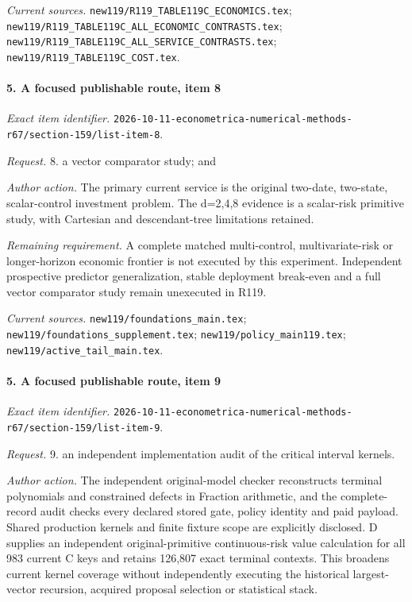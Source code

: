 \par\emph{Current sources.} \nolinkurl{new119/R119_TABLE119C_ECONOMICS.tex}; \nolinkurl{new119/R119_TABLE119C_ALL_ECONOMIC_CONTRASTS.tex}; \nolinkurl{new119/R119_TABLE119C_ALL_SERVICE_CONTRASTS.tex}; \nolinkurl{new119/R119_TABLE119C_COST.tex}.

\paragraph{5. A focused publishable route, item 8}

\emph{Exact item identifier.} \nolinkurl{2026-10-11-econometrica-numerical-methods-r67/section-159/list-item-8}.

\par\emph{Request.} 8. a vector comparator study; and

\par\emph{Author action.} The primary current service is the original two-date, two-state, scalar-control investment problem. The d=2,4,8 evidence is a scalar-risk primitive study, with Cartesian and descendant-tree limitations retained.

\par\emph{Remaining requirement.} A complete matched multi-control, multivariate-risk or longer-horizon economic frontier is not executed by this experiment. Independent prospective predictor generalization, stable deployment break-even and a full vector comparator study remain unexecuted in R119.

\par\emph{Current sources.} \nolinkurl{new119/foundations_main.tex}; \nolinkurl{new119/foundations_supplement.tex}; \nolinkurl{new119/policy_main119.tex}; \nolinkurl{new119/active_tail_main.tex}.

\paragraph{5. A focused publishable route, item 9}

\emph{Exact item identifier.} \nolinkurl{2026-10-11-econometrica-numerical-methods-r67/section-159/list-item-9}.

\par\emph{Request.} 9. an independent implementation audit of the critical interval kernels.

\par\emph{Author action.} The independent original-model checker reconstructs terminal polynomials and constrained defects in Fraction arithmetic, and the complete-record audit checks every declared stored gate, policy identity and paid payload. Shared production kernels and finite fixture scope are explicitly disclosed. D supplies an independent original-primitive continuous-risk value calculation for all 983 current C keys and retains 126,807 exact terminal contexts. This broadens current kernel coverage without independently executing the historical largest-vector recursion, acquired proposal selection or statistical stack.

